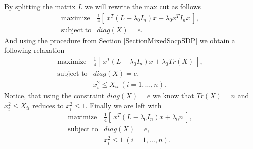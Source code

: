 \documentclass[12pt]{book}
\theoremstyle{definition}
\begin{document}
By splitting the matrix $L$ we will rewrite the max cut as follows
\begin{equation}
\begin{array}{ll}
\mbox{maximize} & \frac{1}{4}\left[ \ x^T(L- \lambda_{0} I_n)x + \lambda_0x^TI_nx \ \right], \\
\mbox{subject to} & diag(X) = e .
\end{array}
\end{equation}
And using the procedure from Section \ref{SectionMixedSocpSDP} we obtain a following relaxation 
%
\begin{equation}
\begin{array}{ll}
\mbox{maximize} & \frac{1}{4}\left[ \ x^T(L- \lambda_{0} I_n)x + \lambda_0Tr(X) \ \right], \\
\mbox{subject to} & diag(X) = e ,\\
&	x_i^2\leq X_{ii} \ (i=1,\dots ,n).
\end{array}
\end{equation}
Notice, that using the constraint $diag(X) = e$ we know that $Tr(X) = n$ and $x_i^2\leq X_{ii}$ reduces to $x_i^2\leq 1$. Finally we are left with  
\begin{equation}
\label{MaxCutMixedSocpSdp1}
\begin{array}{ll}
\mbox{maximize} & \frac{1}{4}\left[ \ x^T(L- \lambda_{0} I_n)x + \lambda_0n \ \right], \\
\mbox{subject to} & diag(X) = e ,\\
&	x_i^2\leq 1 \ (i=1,\dots ,n).
\end{array}
\end{equation}
\end{document}
